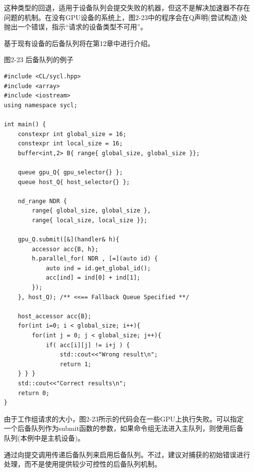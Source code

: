 这种类型的回退，适用于设备队列会提交失败的机器，但这不是解决加速器不存在问题的机制。在没有GPU设备的系统上，图2-23中的程序会在Q声明(尝试构造)处抛出一个错误，指示“请求的设备类型不可用”。\par

基于现有设备的后备队列将在第12章中进行介绍。\par

\hspace*{\fill} \par %
图2-23 后备队列的例子
\begin{lstlisting}[caption={}]
#include <CL/sycl.hpp>
#include <array>
#include <iostream>
using namespace sycl;

int main() {
	constexpr int global_size = 16;
	constexpr int local_size = 16;
	buffer<int,2> B{ range{ global_size, global_size }};
	
	queue gpu_Q{ gpu_selector{} };
	queue host_Q{ host_selector{} };
	
	nd_range NDR {
		range{ global_size, global_size },
		range{ local_size, local_size }};
	
	gpu_Q.submit([&](handler& h){
		accessor acc{B, h};
		h.parallel_for( NDR , [=](auto id) {
			auto ind = id.get_global_id();
			acc[ind] = ind[0] + ind[1];
		});
	}, host_Q); /** <<== Fallback Queue Specified **/

	host_accessor acc{B};
	for(int i=0; i < global_size; i++){
		for(int j = 0; j < global_size; j++){
			if( acc[i][j] != i+j ) {
				std::cout<<"Wrong result\n";
				return 1;
	} } }
	std::cout<<"Correct results\n";
	return 0;
}
\end{lstlisting}

由于工作组请求的大小，图2-23所示的代码会在一些GPU上执行失败。可以指定一个后备队列作为submit函数的参数，如果命令组无法进入主队列，则使用后备队列(本例中是主机设备)。\par

\begin{tcolorbox}[colback=red!5!white,colframe=red!75!black]
通过向提交调用传递后备队列来启用后备队列。不过，建议对捕获的初始错误进行处理，而不是使用提供较少可控性的后备队列机制。
\end{tcolorbox}
